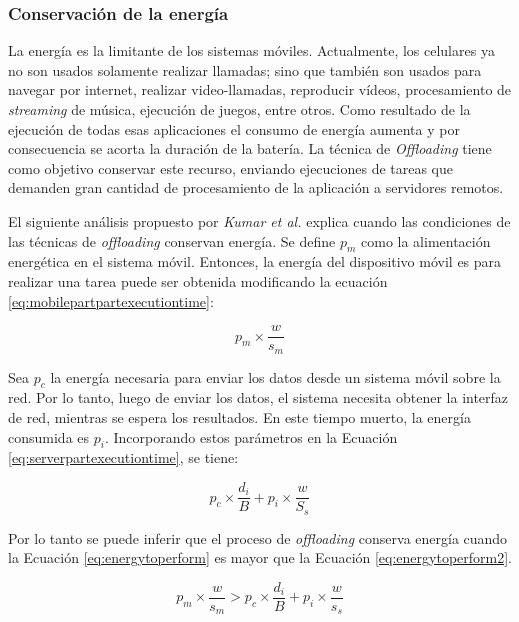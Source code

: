 \subsubsection{Conservación de la energía}

La energía es la limitante de los sistemas móviles. Actualmente, los celulares ya no son usados solamente realizar llamadas; sino que también 
son usados para navegar
por internet, realizar video-llamadas, reproducir vídeos, procesamiento de \textit{streaming} de música, ejecución de juegos, entre otros.
Como resultado de 
la ejecución de todas esas aplicaciones el consumo de energía aumenta y por consecuencia se acorta la duración de la batería. La técnica de 
\textit{Offloading} tiene como objetivo conservar este recurso, enviando ejecuciones de tareas que demanden gran cantidad de 
procesamiento de la aplicación
a servidores remotos. 

El siguiente análisis propuesto por \textit{Kumar et al.}  \cite{raey} explica cuando las condiciones de las técnicas de \textit{offloading} 
conservan energía. Se define  
$p_m$ como la alimentación energética en el sistema móvil. Entonces, la energía del dispositivo móvil es para realizar una tarea puede 
ser obtenida modificando la ecuación 
\ref{eq:mobilepartpartexecutiontime}:

\begin{equation} \label{eq:energytoperform}
 p_m \times \frac{w}{s_m} 
\end{equation}

Sea $p_c$ la energía necesaria para enviar los datos desde un sistema móvil sobre la red. Por lo tanto, luego de enviar los datos, el sistema
necesita obtener la interfaz de red, mientras se espera los resultados. En este tiempo muerto, la energía consumida es $p_i$. Incorporando 
estos parámetros en la Ecuación \ref{eq:serverpartexecutiontime}, se tiene:

\begin{equation} \label{eq:energytoperform2}
 p_c \times \frac{d_i}{B} + p_i \times \frac{w}{S_s}
\end{equation}

Por lo tanto se puede inferir que el proceso de \textit{offloading} conserva energía cuando la Ecuación \ref{eq:energytoperform} es mayor que la Ecuación
\ref{eq:energytoperform2}. 

\begin{equation} %
 p_m \times \frac{w}{s_m} > p_c \times \frac{d_i}{B} + p_i \times \frac{w}{s_s}
\end{equation}

